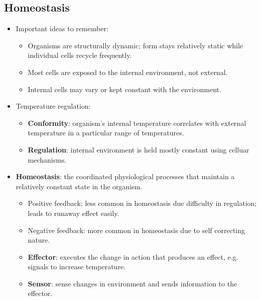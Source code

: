 \documentclass[12pt,a4paper]{article}
\begin{document}
\subsection{Homeostasis}
\begin{itemize}
    \item Important ideas to remember:
        \begin{itemize}
            \item Organisms are structurally dynamic; form stays relatively static while individual cells recycle frequently.
            \item Most cells are exposed to the {\color{o-Sun}internal} environment, not external.
            \item Internal cells may vary or kept constant with the environment.
        \end{itemize}
    \item Temperature regulation:
        \begin{itemize}
            \item \textbf{Conformity}: organism's internal temperature {\color{o-Sun}correlates} with external temperature in a particular range of temperatures. 
            \item \textbf{Regulation}: internal environment is held mostly {\color{o-Sun}constant} using celluar mechanisms.
        \end{itemize}
    \item \textbf{Homeostasis}: the coordinated physiological processes that maintain a relatively constant state in the organism.
        \begin{itemize}
            \item {\color{pos}Positive feedback}: less common in homeostasis due difficulty in regulation; leads to runaway effect easily.
            \item {\color{neg}Negative feedback}: more common in homeostasis due to self correcting nature.
            \item \textbf{Effector}: executes the change in action that produces an effect, e.g. signals to increase temperature.
            \item \textbf{Sensor}: sense changes in environment and sends information to the effector.
        \end{itemize}
\end{itemize}
\end{document}
